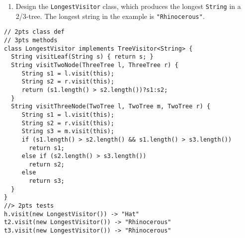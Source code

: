 \documentclass[12pt]{article}                   %
\newenvironment{solution}{\color{red}}{}
\begin{document}
\begin{problem}
\begin{enumerate}
\newpage

\item Design the \verb|LongestVisitor| class, which produces the longest
\verb|String| in a 2/3-tree.  The longest string in the example is
\verb|"Rhinocerous"|.  
\end{enumerate}

\begin{solution}
\begin{verbatim}
// 2pts class def
// 3pts methods
class LongestVisitor implements TreeVisitor<String> {
  String visitLeaf(String s) { return s; }
  String visitTwoNode(ThreeTree l, ThreeTree r) { 
     String s1 = l.visit(this);
     String s2 = r.visit(this);
     return (s1.length() > s2.length())?s1:s2;
  }
  String visitThreeNode(TwoTree l, TwoTree m, TwoTree r) { 
     String s1 = l.visit(this);
     String s2 = r.visit(this);
     String s3 = m.visit(this);
     if (s1.length() > s2.length() && s1.length() > s3.length())
       return s1;
     else if (s2.length() > s3.length())
       return s2;
     else
       return s3;
  }
}
//> 2pts tests
h.visit(new LongestVisitor()) -> "Hat"
t2.visit(new LongestVisitor()) -> "Rhinocerous"
t3.visit(new LongestVisitor()) -> "Rhinocerous"
\end{verbatim}
\end{solution}

\newpage

\end{problem}
\end{document}
